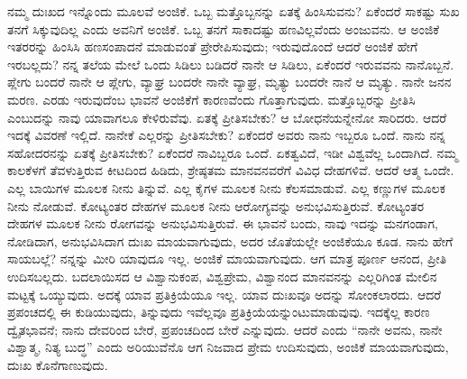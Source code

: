 ನಮ್ಮ ದುಃಖದ ಇನ್ನೊಂದು ಮೂಲವೆ ಅಂಜಿಕೆ. ಒಬ್ಬ ಮತ್ತೊಬ್ಬನನ್ನು ಏತಕ್ಕೆ ಹಿಂಸಿಸುವನು? ಏಕೆಂದರೆ ಸಾಕಷ್ಟು ಸುಖ ತನಗೆ ಸಿಕ್ಕುವುದಿಲ್ಲ ಎಂದು ಅವನಿಗೆ ಅಂಜಿಕೆ. ಒಬ್ಬ ತನಗೆ ಸಾಕಾದಷ್ಟು ಹಣವಿಲ್ಲವೆಂದು ಅಂಜುವನು. ಆ ಅಂಜಿಕೆ ಇತರರನ್ನು ಹಿಂಸಿಸಿ ಹಣಸಂಪಾದನೆ ಮಾಡುವಂತೆ ಪ್ರೇರೇಪಿಸುವುದು; ಇರುವುದೊಂದೆ ಆದರೆ ಅಂಜಿಕೆ ಹೇಗೆ ಇರಬಲ್ಲದು? ನನ್ನ ತಲೆಯ ಮೇಲೆ ಒಂದು ಸಿಡಿಲು ಬಡಿದರೆ ನಾನೇ ಆ ಸಿಡಿಲು, ಏಕೆಂದರೆ ಇರುವವನು ನಾನೊಬ್ಬನೆ. ಪ್ಲೇಗು ಬಂದರೆ ನಾನೇ ಆ ಪ್ಲೇಗು, ವ್ಯಾಘ್ರ ಬಂದರೇ ನಾನೇ ವ್ಯಾಘ್ರ, ಮೃತ್ಯು ಬಂದರೇ ನಾನೆ ಆ ಮೃತ್ಯು. ನಾನೇ ಜನನ ಮರಣ. ಎರಡು ಇರುವುದೆಂಬ ಭಾವನೆ ಅಂಜಿಕೆಗೆ ಕಾರಣವೆಂದು ಗೊತ್ತಾಗುವುದು. ಮತ್ತೊಬ್ಬರನ್ನು ಪ್ರೀತಿಸಿ ಎಂಬುದನ್ನು ನಾವು ಯಾವಾಗಲೂ ಕೇಳಿರುವೆವು. ಏತಕ್ಕೆ ಪ್ರೀತಿಸಬೇಕು? ಆ ಬೋಧನೆಯನ್ನೇನೋ ಸಾರಿದರು. ಆದರೆ ಇದಕ್ಕೆ ವಿವರಣೆ ಇಲ್ಲಿದೆ. ನಾನೇಕೆ ಎಲ್ಲರನ್ನು ಪ್ರೀತಿಸಬೇಕು? ಏಕೆಂದರೆ ಅವರು ನಾನು ಇಬ್ಬರೂ ಒಂದೆ. ನಾನು ನನ್ನ ಸಹೋದರನನ್ನು ಏತಕ್ಕೆ ಪ್ರೀತಿಸಬೇಕು? ಏಕೆಂದರೆ ನಾವಿಬ್ಬರೂ ಒಂದೆ. ಏಕತ್ವವಿದೆ, ಇಡೀ ವಿಶ್ವವೆಲ್ಲ ಒಂದಾಗಿದೆ. ನಮ್ಮ ಕಾಲಕೆಳಗೆ ತೆವಳುತ್ತಿರುವ ಕೀಟದಿಂದ ಹಿಡಿದು, ಶ್ರೇಷ್ಠತಮ ಮಾನವನವರೆಗೆ ವಿವಿಧ ದೇಹಗಳಿವೆ. ಆದರೆ ಆತ್ಮ ಒಂದೇ. ಎಲ್ಲ ಬಾಯಿಗಳ ಮೂಲಕ ನೀನು ತಿನ್ನುವೆ. ಎಲ್ಲ ಕೈಗಳ ಮೂಲಕ ನೀನು ಕೆಲಸಮಾಡುವೆ. ಎಲ್ಲ ಕಣ್ಣುಗಳ ಮೂಲಕ ನೀನು ನೋಡುವೆ. ಕೋಟ್ಯಂತರ ದೇಹಗಳ ಮೂಲಕ ನೀನು ಆರೋಗ್ಯವನ್ನು ಅನುಭವಿಸುತ್ತಿರುವೆ. ಕೋಟ್ಯಂತರ ದೇಹಗಳ ಮೂಲಕ ನೀನು ರೋಗವನ್ನು ಅನುಭವಿಸುತ್ತಿರುವೆ. ಈ ಭಾವನೆ ಬಂದು, ನಾವು ಇದನ್ನು ಮನಗಂಡಾಗ, ನೋಡಿದಾಗ, ಅನುಭವಿಸಿದಾಗ ದುಃಖ ಮಾಯವಾಗುವುದು, ಅದರ ಜೊತೆಯಲ್ಲೇ ಅಂಜಿಕೆಯೂ ಕೂಡ. ನಾನು ಹೇಗೆ ಸಾಯಬಲ್ಲೆ? ನನ್ನನ್ನು ಮೀರಿ ಯಾವುದೂ ಇಲ್ಲ. ಅಂಜಿಕೆ ಮಾಯವಾಗುವುದು. ಆಗ ಮಾತ್ರ ಪೂರ್ಣ ಆನಂದ, ಪ್ರೀತಿ ಉದಿಸಬಲ್ಲದು. ಬದಲಾಯಿಸದ ಆ ವಿಶ್ವಾನುಕಂಪ, ವಿಶ್ವಪ್ರೇಮ, ವಿಶ್ವಾನಂದ ಮಾನವನನ್ನು ಎಲ್ಲರಿಗಿಂತ ಮೇಲಿನ ಮಟ್ಟಕ್ಕೆ ಒಯ್ಯುವುದು. ಅದಕ್ಕೆ ಯಾವ ಪ್ರತಿಕ್ರಿಯೆಯೂ ಇಲ್ಲ. ಯಾವ ದುಃಖವೂ ಅದನ್ನು ಸೋಂಕಲಾರದು. ಆದರೆ ಪ್ರಪಂಚದಲ್ಲಿ ಈ ಕುಡಿಯುವುದು, ತಿನ್ನುವುದು ಇವೆಲ್ಲವೂ ಪ್ರತಿಕ್ರಿಯೆಯನ್ನುಂಟುಮಾಡುವುವು. ಇದಕ್ಕೆಲ್ಲ ಕಾರಣ ದ್ವೈತಭಾವನೆ; ನಾನು ದೇವರಿಂದ ಬೇರೆ, ಪ್ರಪಂಚದಿಂದ ಬೇರೆ ಎನ್ನುವುದು. ಆದರೆ ಎಂದು “ನಾನೇ ಅವನು, ನಾನೇ ವಿಶ್ವಾತ್ಮ, ನಿತ್ಯ ಬುದ್ಧ” ಎಂದು ಅರಿಯುವೆನೊ ಆಗ ನಿಜವಾದ ಪ್ರೇಮ ಉದಿಸುವುದು, ಅಂಜಿಕೆ ಮಾಯವಾಗುವುದು, ದುಃಖ ಕೊನೆಗಾಣುವುದು.

